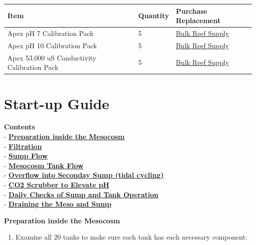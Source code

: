 \documentclass[
]{book}
\providecommand{\tightlist}{%
  \setlength{\itemsep}{0pt}\setlength{\parskip}{0pt}}
\begin{document}
\begin{longtable}[]{@{}lll@{}}
\toprule
Item & Quantity & Purchase Replacement \\
\midrule
\endhead
Apex pH 7 Calibration Pack & 5 & \href{https://www.bulkreefsupply.com/probe-calibration-kit-ph-7-0-ph-10-0-salinity-53000us-neptune-systems.html}{Bulk Reef Supply} \\
Apex pH 10 Calibration Pack & 5 & \href{https://www.bulkreefsupply.com/probe-calibration-kit-ph-7-0-ph-10-0-salinity-53000us-neptune-systems.html}{Bulk Reef Supply} \\
Apex 53,000 uS Conductivity Calibration Pack & 5 & \href{https://www.bulkreefsupply.com/probe-calibration-kit-ph-7-0-ph-10-0-salinity-53000us-neptune-systems.html}{Bulk Reef Supply} \\
\bottomrule
\end{longtable}

\hypertarget{start-up-guide}{%
\chapter{Start-up Guide}\label{start-up-guide}}

\textbf{Contents}\\
- \protect\hyperlink{Preparation}{\textbf{Preparation inside the Mesocosm}}\\
- \protect\hyperlink{Filtration}{\textbf{Filtration}}\\
- \protect\hyperlink{Sump_Flow}{\textbf{Sump Flow}}\\
- \protect\hyperlink{Meso_Flow}{\textbf{Mesocosm Tank Flow}}\\
- \protect\hyperlink{Overflow_into_Secondary_Sump}{\textbf{Overflow into Seconday Sump (tidal cycling)}}\\
- \protect\hyperlink{CO2_Scrubber}{\textbf{CO2 Scrubber to Elevate pH}}\\
- \protect\hyperlink{Daily_Checks}{\textbf{Daily Checks of Sump and Tank Operation}}\\
- \protect\hyperlink{Draining_Sump}{\textbf{Draining the Meso and Sump}}

\textbf{Preparation inside the Mesocosm}

\begin{enumerate}
\def\labelenumi{\arabic{enumi}.}
\tightlist
\item
  Examine all 20 tanks to make sure each tank has each necessary component:
\end{enumerate}
\end{document}
